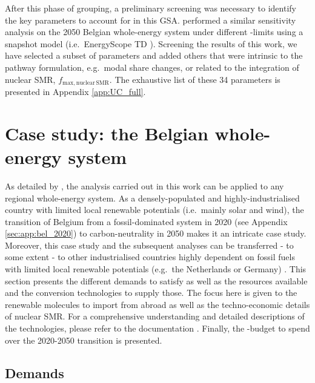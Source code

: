 \documentclass[11pt,twoside,a4paper,english]{article}
\def\eg{e.g.\ }
\def\ie{i.e.\ }
\begin{document}
After this phase of grouping, a preliminary screening was necessary to identify the key parameters to account for in this \gls{GSA}. \citet{rixhon2021role} performed a similar sensitivity analysis on the 2050 Belgian whole-energy system under different -limits using a snapshot model (\ie EnergyScope TD \cite{limpens2019energyscope}). Screening the results of this work, we have selected a subset of parameters and added others that were intrinsic to the pathway formulation, \eg modal share changes, or related to the integration of nuclear SMR, $f_{\mathrm{max,nuclear\,SMR}}$. The exhaustive list of these 34 parameters is presented in Appendix \ref{app:UC_full}.


\section{Case study: the Belgian whole-energy system}
\label{sec:case_study}
As detailed by \citet{limpens2023pathway}, the analysis carried out in this work can be applied to any regional whole-energy system. As a densely-populated and highly-industrialised country with limited local renewable potentials (\ie mainly solar and wind), the transition of Belgium from a fossil-dominated system in 2020 (see Appendix \ref{sec:app:bel_2020}) to carbon-neutrality in 2050 makes it an intricate case study. Moreover, this case study and the subsequent analyses can be transferred - to some extent - to other industrialised countries highly dependent on fossil fuels with limited local renewable potentials (\eg the Netherlands or Germany) \cite{dommisse2020modelling}. This section presents the different demands to satisfy as well as the resources available and the conversion technologies to supply those. The focus here is given to the renewable molecules to import from abroad as well as the techno-economic details of nuclear SMR. For a comprehensive understanding and detailed descriptions of the technologies, please refer to the documentation \cite{readthedocs_pathway}. Finally, the -budget to spend over the 2020-2050 transition is presented.


\subsection{Demands}
\label{subsec:cs:demand}
\end{document}
